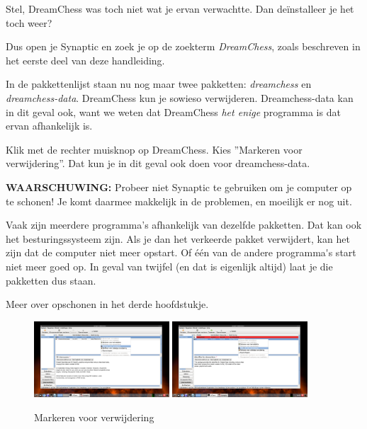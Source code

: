 \documentclass[12pt,a4paper]{article}
\begin{document}
Stel, DreamChess was toch niet wat je ervan verwachtte. Dan de\"{i}nstalleer je het toch weer?

Dus open je Synaptic en zoek je op de zoekterm \emph{DreamChess}, zoals beschreven in het eerste deel van deze handleiding. 

In de pakkettenlijst staan nu nog maar twee pakketten: \emph{dreamchess} en \emph{dreamchess-data}. DreamChess kun je sowieso verwijderen. Dreamchess-data kan in dit geval ook, want we weten dat DreamChess \emph{het enige} programma is dat ervan afhankelijk is. 

Klik met de rechter muisknop op DreamChess. Kies ''Markeren voor verwijdering''. Dat kun je in dit geval ook doen voor dreamchess-data. 

\vspace{1em}

\noindent \textbf{\color{red}WAARSCHUWING:} Probeer niet Synaptic te gebruiken om je computer op te schonen! Je komt daarmee makkelijk in de problemen, en moeilijk er nog uit. 

Vaak zijn meerdere programma's afhankelijk van dezelfde pakketten. Dat kan ook het bestu{}ringssysteem zijn. Als je dan het verkeerde pakket verwijdert, kan het zijn dat de computer niet meer opstart. Of \'{e}\'{e}n van de andere programma\'{}s start niet meer goed op. In geval van twijfel (en dat is eigenlijk altijd) laat je die pakketten dus staan. 

Meer over opschonen in het derde hoofdstukje.

\begin{figure} [H]
\centering
\includegraphics[width=0.45\textwidth]{plaatje16}
\includegraphics[width=0.45\textwidth]{plaatje17}
\caption{Markeren voor verwijdering}
\label{plaatje16}
\end{figure}
\end{document}
